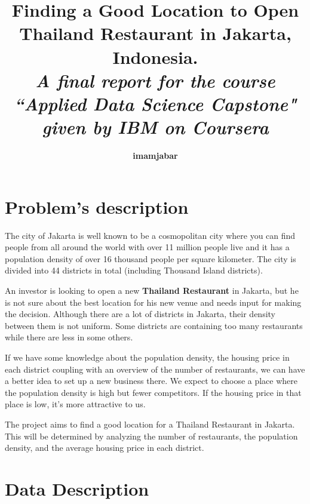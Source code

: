 \documentclass[12pt,a4paper]{article}
\title{\textbf{Finding a Good Location to Open Thailand Restaurant in Jakarta, Indonesia.}\\{\normalsize \textit{A final report for the course ``Applied Data Science Capstone" given by IBM on Coursera}}}
\author{\textbf{imamjabar}}
\begin{document}
\maketitle

\tableofcontents

\section{Problem's description}
\label{sec:problem}

The city of Jakarta is well known to be a cosmopolitan city where you can find people from all around the world with over 11 million people live and it has a population density of over 16 thousand people per square kilometer. The city is divided into 44 districts in total (including Thousand Island districts).

An investor is looking to open a new \textbf{Thailand Restaurant} in Jakarta, but he is not sure about the best location for his new venue and needs input for making the decision. Although there are a lot of districts in Jakarta, their density between them is not uniform. Some districts are containing too many restaurants while there are less in some others.

If we have some knowledge about the population density, the housing price in each district coupling with an overview of the number of restaurants, we can have a better idea to set up a new business there. We expect to choose a place where the population density is high but fewer competitors. If the housing price in that place is low, it’s more attractive to us.

The project aims to find a good location for a Thailand Restaurant in Jakarta. This will be determined by analyzing the number of restaurants, the population density, and the average housing price in each district.

\section{Data Description}
\end{document}
